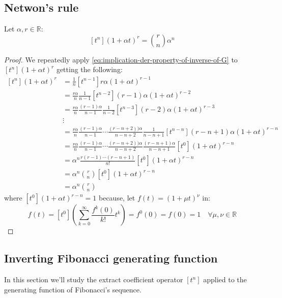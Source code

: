 \subsection{Netwon's rule}
Let $\alpha, r \in \mathbb{R} $:
\begin{equation}
  \label{eq:newton-rule}
  [t^{n}] (1 + \alpha t)^r = {{r}\choose{n}} \alpha^n
\end{equation}
\begin{proof}[Proof]
  We repeatedly apply
  \autoref{eq:implication-der-property-of-inverse-of-G} to $[t^{n}] (1
  + \alpha t)^r$ getting the following:
  \begin{displaymath}
    \begin{split}
      [t^{n}] (1 + \alpha t)^r &= \frac{1}{n} [t^{n-1}] r\alpha(1 +
      \alpha t)^{r-1} \\
      &= \frac{r\alpha}{n} \frac{1}{n-1}[t^{n-2}] (r-1)\alpha(1 +
      \alpha t)^{r-2}\\
      &= \frac{r\alpha}{n}
      \frac{(r-1)\alpha}{n-1}\frac{1}{n-2}[t^{n-3}] (r-2)\alpha(1 +
      \alpha t)^{r-3}\\
      &\vdots\\
      &= \frac{r\alpha}{n} \frac{(r-1)\alpha}{n-1}\cdots
      \frac{(r-n+2))\alpha}{n-n+2} \frac{1}{n-n+1}[t^{n-n}]
      (r-n+1)\alpha(1 +
      \alpha t)^{r-n}\\
      &= \frac{r\alpha}{n} \frac{(r-1)\alpha}{n-1}\cdots
      \frac{(r-n+2))\alpha}{n-n+2} \frac{(r-n+1)\alpha}{n-n+1}[t^{0}]
      (1 +      \alpha t)^{r-n}\\
      &= \alpha^n \frac{r(r-1)\cdots(r-n+1)}{n!}[t^{0}]
      (1 +      \alpha t)^{r-n}\\
      &= \alpha^n {{r}\choose{n}} [t^{0}]
      (1 +      \alpha t)^{r-n}\\
      &= \alpha^n {{r}\choose{n}} 
    \end{split}
  \end{displaymath}
  where $[t^{0}] (1 + \alpha t)^{r-n} = 1$ because, let $f(t)= (1 +
  \mu t)^{\nu}$ in:
  \begin{displaymath}
    [t^0]f(t) = [t^0] \left(\sum_{k=0}^{\infty}{
        \frac{f^k(0)}{k!}t^k } \right) = f^0(0) = f(0) = 1 \quad
    \forall \mu, \nu \in \mathbb{R} 
\end{displaymath}

\end{proof}

\subsection{Inverting Fibonacci generating function}
In this section we'll study the extract coefficient operator $[t^{n}]$
applied to the generating function of Fibonacci's sequence.

